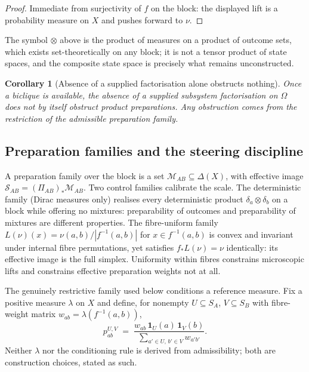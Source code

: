 \documentclass[11pt,a4paper]{article}
\newtheorem{corollary}[theorem]{Corollary}
\newcommand{\Om}{\Omega}
\newcommand{\PiAB}{\Pi_{AB}}
\newcommand{\SAB}{\mathcal{S}_{AB}}
\begin{document}
    \begin{proof}
      Immediate from surjectivity of $f$ on the block: the displayed lift is a probability measure on $X$
      and pushes forward to $\nu$.
    \end{proof}

    The symbol $\otimes$ above is the product of measures on a product of outcome sets, which exists
    set-theoretically on any block; it is not a tensor product of state spaces, and the composite state
    space is precisely what remains unconstructed.

    \begin{corollary}[Absence of a supplied factorisation alone obstructs nothing]
      \label{cor:noobstruction}
      Once a biclique is available, the absence of a supplied subsystem factorisation on $\Om$ does not by
      itself obstruct product preparations.
      Any obstruction comes from the restriction of the admissible preparation family.
    \end{corollary}

  \subsection{Preparation families and the steering discipline}
    \label{ssec:families}

    A preparation family over the block is a set $\mathcal{M}_{AB} \subseteq \Delta(X)$, with effective
    image $\SAB = (\PiAB)_* \mathcal{M}_{AB}$.
    Two control families calibrate the scale.
    The deterministic family (Dirac measures only) realises every deterministic product
    $\delta_a \otimes \delta_b$ on a block while offering no mixtures: preparability of outcomes and
    preparability of mixtures are different properties.
    The fibre-uniform family $L(\nu)(x) = \nu(a,b)/|f^{-1}(a,b)|$ for $x \in f^{-1}(a,b)$ is convex and
    invariant under internal fibre permutations, yet satisfies $f_* L(\nu) = \nu$ identically: its effective
    image is the full simplex.
    Uniformity within fibres constrains microscopic lifts and constrains effective preparation weights not
    at all.

    The genuinely restrictive family used below conditions a reference measure.
    Fix a positive measure $\lambda$ on $X$ and define, for nonempty $U \subseteq S_A$,
    $V \subseteq S_B$ with fibre-weight matrix $w_{ab} = \lambda(f^{-1}(a,b))$,
    \begin{equation}
      \label{eq:conditioning}
      p^{U,V}_{ab}
      \;=\;
      \frac{w_{ab}\, \mathbf{1}_U(a)\, \mathbf{1}_V(b)}
           {\sum_{a' \in U,\, b' \in V} w_{a'b'}}.
    \end{equation}
    Neither $\lambda$ nor the conditioning rule is derived from admissibility; both are construction
    choices, stated as such.
\end{document}

